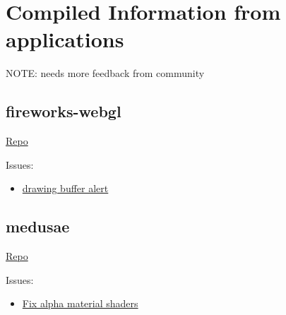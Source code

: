 \section{Compiled Information from
applications}\label{compiled-information-from-applications}

NOTE: needs more feedback from community

\subsection{fireworks-webgl}\label{fireworks-webgl}

\href{https://github.com/ondras/fireworks-webgl/}{Repo}

Issues:

\begin{itemize}
\tightlist
\item
  \href{https://github.com/ondras/fireworks-webgl/commit/993566ae843d0d8882a9173614258a86aacdcd9a}{drawing
  buffer alert}
\end{itemize}

\subsection{medusae}\label{medusae}

\href{https://github.com/jpweeks/particulate-medusae}{Repo}

Issues:

\begin{itemize}
\tightlist
\item
  \href{https://github.com/jpweeks/particulate-medusae/commit/6ef54b1d5cc370a91be98ff30d66261059546d3e}{Fix
  alpha material shaders}
\end{itemize}
